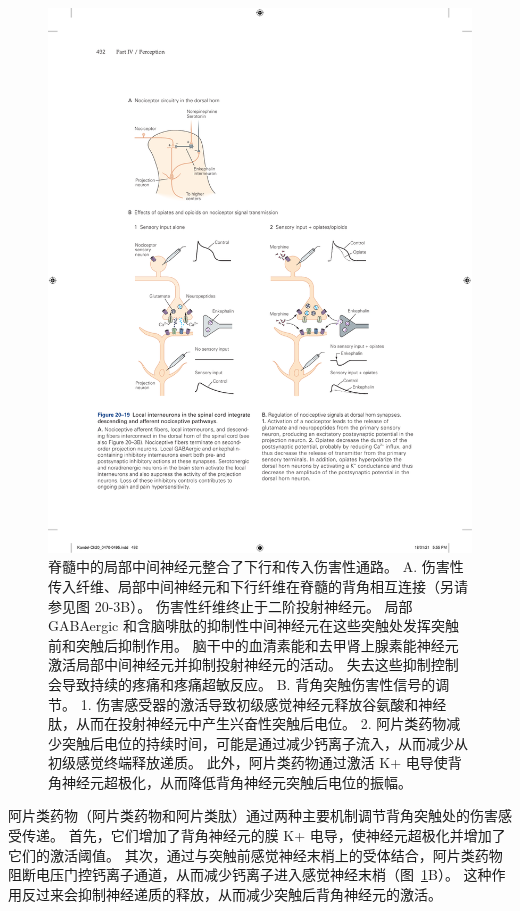\begin{figure}[htbp]
	\centering
	\includegraphics[width=1.0\linewidth]{chap20/fig_20_19}
	\caption{脊髓中的局部中间神经元整合了下行和传入伤害性通路。
		A. 伤害性传入纤维、局部中间神经元和下行纤维在脊髓的背角相互连接（另请参见图 20-3B）。
		伤害性纤维终止于二阶投射神经元。
		局部 GABAergic 和含脑啡肽的抑制性中间神经元在这些突触处发挥突触前和突触后抑制作用。
		脑干中的血清素能和去甲肾上腺素能神经元激活局部中间神经元并抑制投射神经元的活动。
		失去这些抑制控制会导致持续的疼痛和疼痛超敏反应。
		B. 背角突触伤害性信号的调节。
		1. 伤害感受器的激活导致初级感觉神经元释放谷氨酸和神经肽，从而在投射神经元中产生兴奋性突触后电位。
		2. 阿片类药物减少突触后电位的持续时间，可能是通过减少钙离子流入，从而减少从初级感觉终端释放递质。
		此外，阿片类药物通过激活 K+ 电导使背角神经元超极化，从而降低背角神经元突触后电位的振幅。}
	\label{fig:20_19}
\end{figure}


阿片类药物（阿片类药物和阿片类肽）通过两种主要机制调节背角突触处的伤害感受传递。
首先，它们增加了背角神经元的膜 K+ 电导，使神经元超极化并增加了它们的激活阈值。
其次，通过与突触前感觉神经末梢上的受体结合，阿片类药物阻断电压门控钙离子通道，从而减少钙离子进入感觉神经末梢（图~\ref{fig:20_19}B）。
这种作用反过来会抑制神经递质的释放，从而减少突触后背角神经元的激活。



